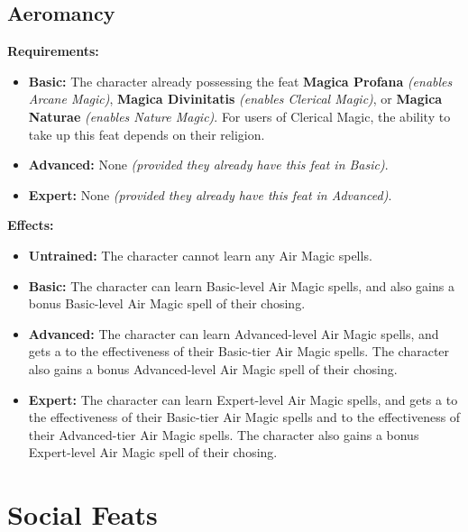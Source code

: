 \documentclass[openany,10pt,a4paper]{book}
\begin{document}
\subsection{Aeromancy}
\begin{table}[!ht]
\centering
{}
\end{table}
\textbf{Requirements:}
\begin{itemize}
	\item \textbf{Basic:} The character already possessing the feat \textbf{Magica Profana} \textit{(enables Arcane Magic)}, \textbf{Magica Divinitatis} \textit{(enables Clerical Magic)}, or \textbf{Magica Naturae} \textit{(enables Nature Magic)}. For users of Clerical Magic, the ability to take up this feat depends on their religion.
	\item \textbf{Advanced:} None \textit{(provided they already have this feat in Basic)}.
	\item \textbf{Expert:} None \textit{(provided they already have this feat in Advanced)}.
\end{itemize}
\textbf{Effects:}
\begin{itemize}
	\item \textbf{Untrained:} The character cannot learn any Air Magic spells.
	\item \textbf{Basic:} The character can learn Basic-level Air Magic spells, and also gains a bonus Basic-level Air Magic spell of their chosing.
	\item \textbf{Advanced:} The character can learn Advanced-level Air Magic spells, and gets a  to the effectiveness of their Basic-tier Air Magic spells. The character also gains a bonus Advanced-level Air Magic spell of their chosing.
	\item \textbf{Expert:} The character can learn Expert-level Air Magic spells, and gets a  to the effectiveness of their Basic-tier Air Magic spells and  to the effectiveness of their Advanced-tier Air Magic spells. The character also gains a bonus Expert-level Air Magic spell of their chosing.
\end{itemize}\newpage
\section{Social Feats}
\end{document}
